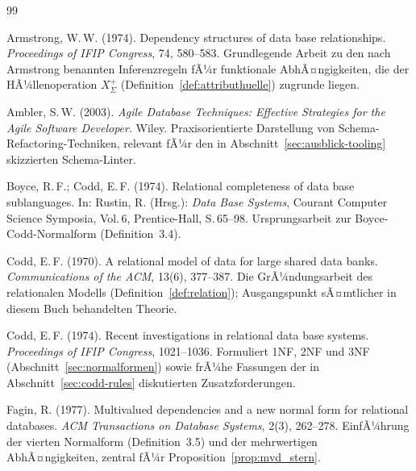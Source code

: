 ﻿\documentclass[a4paper,12pt]{report}
\theoremstyle{definition}
\theoremstyle{remark}
\begin{document}

\begin{thebibliography}{99}


Armstrong, W.\,W. (1974).
\newblock Dependency structures of data base relationships.
\newblock \emph{Proceedings of IFIP Congress}, 74, 580--583.
\newblock Grundlegende Arbeit zu den nach Armstrong benannten
Inferenzregeln fÃ¼r funktionale AbhÃ¤ngigkeiten, die der
HÃ¼llenoperation $X^+_\Sigma$ (Definition~\ref{def:attributhuelle})
zugrunde liegen.

Ambler, S.\,W. (2003).
\newblock \emph{Agile Database Techniques: Effective Strategies for the Agile
Software Developer}.
\newblock Wiley.
\newblock Praxisorientierte Darstellung von Schema-Refactoring-Techniken,
relevant fÃ¼r den in Abschnitt~\ref{sec:ausblick-tooling} skizzierten
Schema-Linter.

Boyce, R.\,F.; Codd, E.\,F. (1974).
\newblock Relational completeness of data base sublanguages.
\newblock In: Rustin, R. (Hrsg.): \emph{Data Base Systems}, Courant Computer
Science Symposia, Vol.\,6, Prentice-Hall, S.\,65--98.
\newblock Ursprungsarbeit zur Boyce-Codd-Normalform (Definition~3.4).

Codd, E.\,F. (1970).
\newblock A relational model of data for large shared data banks.
\newblock \emph{Communications of the ACM}, 13(6), 377--387.
\newblock Die GrÃ¼ndungsarbeit des relationalen Modells
(Definition~\ref{def:relation}); Ausgangspunkt sÃ¤mtlicher in diesem
Buch behandelten Theorie.

Codd, E.\,F. (1974).
\newblock Recent investigations in relational data base systems.
\newblock \emph{Proceedings of IFIP Congress}, 1021--1036.
\newblock Formuliert 1NF, 2NF und 3NF (Abschnitt~\ref{sec:normalformen})
sowie frÃ¼he Fassungen der in Abschnitt~\ref{sec:codd-rules}
diskutierten Zusatzforderungen.

Fagin, R. (1977).
\newblock Multivalued dependencies and a new normal form for relational
databases.
\newblock \emph{ACM Transactions on Database Systems}, 2(3), 262--278.
\newblock EinfÃ¼hrung der vierten Normalform (Definition~3.5) und der
mehrwertigen AbhÃ¤ngigkeiten, zentral fÃ¼r
Proposition~\ref{prop:mvd_stern}.


\end{thebibliography}
\end{document}
